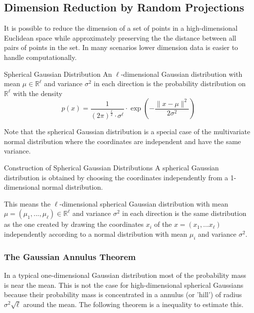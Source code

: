 \documentclass[english]{panikzettel}
\begin{document}

\subsection{Dimension Reduction by Random Projections}
It is possible to reduce the dimension of a set of points in a high-dimensional Euclidean space while approximately preserving the the distance between all pairs of points in the set. In many scenarios lower dimension data is easier to handle computationally.

\begin{halfboxl}
\vspace{-\baselineskip}
\begin{defi}{Spherical Gaussian Distribution}
An $\ell$-dimensional Gaussian distribution with mean $\mu \in \mathbb{R}^\ell$ and variance $\sigma^2$ in each direction is the probability distribution on $\mathbb{R}^\ell$ with the density
\[
p(x)=\frac{1}{(2 \pi)^\frac{\ell}{2}\cdot \sigma^\ell}\cdot \exp \left(-\frac{\parallel x-\mu \parallel^2}{2\sigma^2} \right)
\]
\end{defi}
\end{halfboxl}
\begin{halfboxr}
\vspace{-\baselineskip}
Note that the spherical Gaussian distribution is a special case of the multivariate normal distribution where the coordinates are independent and have the same variance.
\end{halfboxr}
\begin{theo}{Construction of Spherical Gaussian Distributions}
A spherical Gaussian distribution is obtained by choosing the coordinates independently from a 1-dimensional normal distribution.

This means the $\ell$-dimensional spherical Gaussian distribution with mean $\mu=(\mu_1,...,\mu_\ell)\in\mathbb{R}^\ell$ and variance $\sigma^2$ in each direction is the same distribution as the one created by drawing the coordinates $x_i$ of the $x=(x_1,...x_\ell)$ independently according to a normal distribution with mean $\mu_i$ and variance $\sigma^2$.
\end{theo}

\subsubsection{The Gaussian Annulus Theorem}
In a typical one-dimensional Gaussian distribution most of the probability mass is near the mean. This is not the case for high-dimensional spherical Gaussians because their probability mass is concentrated in a annulus (or 'hill') of radius $\sigma^2 \sqrt{\ell}$ around the mean. The following theorem is a inequality to estimate this.
\end{document}
